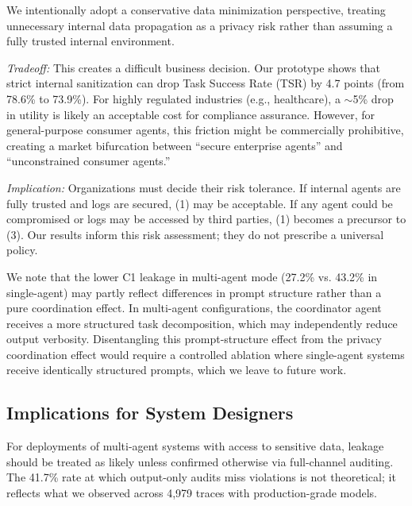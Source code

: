 \documentclass{ieeeaccess}
\begin{document}
We intentionally adopt a conservative data minimization perspective, treating unnecessary internal data propagation as a privacy risk rather than assuming a fully trusted internal environment.

\textit{Tradeoff:} This creates a difficult business decision. Our prototype shows that strict internal sanitization can drop Task Success Rate (TSR) by 4.7 points (from 78.6\% to 73.9\%). For highly regulated industries (e.g., healthcare), a $\sim$5\% drop in utility is likely an acceptable cost for compliance assurance. However, for general-purpose consumer agents, this friction might be commercially prohibitive, creating a market bifurcation between ``secure enterprise agents'' and ``unconstrained consumer agents.''

\textit{Implication:} Organizations must decide their risk tolerance. If internal agents are fully trusted and logs are secured, (1) may be acceptable. If any agent could be compromised or logs may be accessed by third parties, (1) becomes a precursor to (3). Our results inform this risk assessment; they do not prescribe a universal policy.

We note that the lower C1 leakage in multi-agent mode (27.2\% vs. 43.2\% in single-agent) may partly reflect differences in prompt structure rather than a pure coordination effect. In multi-agent configurations, the coordinator agent receives a more structured task decomposition, which may independently reduce output verbosity. Disentangling this prompt-structure effect from the privacy coordination effect would require a controlled ablation where single-agent systems receive identically structured prompts, which we leave to future work.

\subsection{Implications for System Designers}

For deployments of multi-agent systems with access to sensitive data, leakage should be treated as likely unless confirmed otherwise via full-channel auditing. The 41.7\% rate at which output-only audits miss violations is not theoretical; it reflects what we observed across 4,979 traces with production-grade models.
\end{document}
